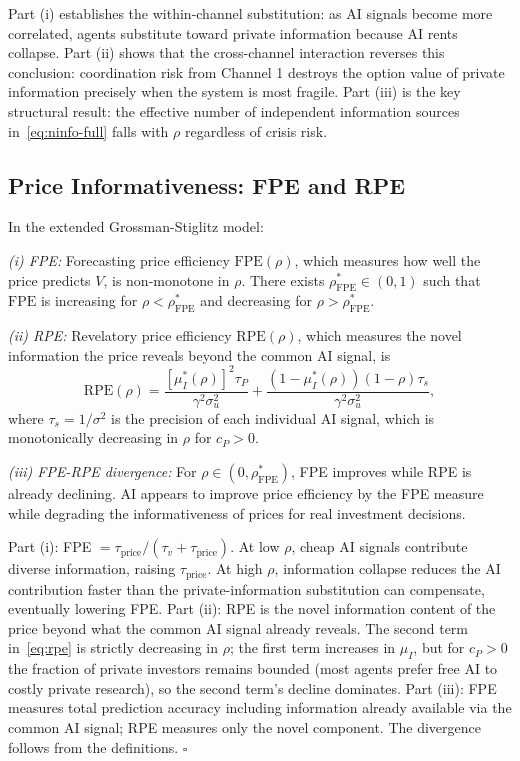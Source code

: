 Part (i) establishes the within-channel substitution: as AI signals become more correlated, agents substitute toward private information because AI rents collapse. Part (ii) shows that the cross-channel interaction reverses this conclusion: coordination risk from Channel 1 destroys the option value of private information precisely when the system is most fragile. Part (iii) is the key structural result: the effective number of independent information sources in~\eqref{eq:ninfo-full} falls with $\rho$ regardless of crisis risk.

\subsection{Price Informativeness: FPE and RPE}

\begin{proposition}\label{prop:rpe}
  In the extended Grossman-Stiglitz model:

  \emph{(i) FPE:} Forecasting price efficiency $\mathrm{FPE}(\rho)$, which measures how well the price predicts $V$, is non-monotone in $\rho$. There exists $\rho_{\text{FPE}}^* \in (0,1)$ such that $\mathrm{FPE}$ is increasing for $\rho < \rho_{\text{FPE}}^*$ and decreasing for $\rho > \rho_{\text{FPE}}^*$.

  \emph{(ii) RPE:} Revelatory price efficiency $\mathrm{RPE}(\rho)$, which measures the novel information the price reveals beyond the common AI signal, is
  \begin{equation}\label{eq:rpe}
    \mathrm{RPE}(\rho) = \frac{\left[\mu_I^*(\rho)\right]^2 \tau_P}{\gamma^2 \sigma_u^2} + \frac{(1-\mu_I^*(\rho))(1-\rho)\tau_s}{\gamma^2\sigma_u^2},
  \end{equation}
  where $\tau_s = 1/\sigma^2$ is the precision of each individual AI signal,
  which is monotonically decreasing in $\rho$ for $c_P > 0$.

  \emph{(iii) FPE-RPE divergence:} For $\rho \in (0, \rho_{\text{FPE}}^*)$, FPE improves while RPE is already declining. AI appears to improve price efficiency by the FPE measure while degrading the informativeness of prices for real investment decisions.

   Part (i): FPE $= \tau_{\text{price}}/(\tau_v + \tau_{\text{price}})$. At low $\rho$, cheap AI signals contribute diverse information, raising $\tau_{\text{price}}$. At high $\rho$, information collapse reduces the AI contribution faster than the private-information substitution can compensate, eventually lowering FPE. Part (ii): RPE is the novel information content of the price beyond what the common AI signal already reveals. The second term in~\eqref{eq:rpe} is strictly decreasing in $\rho$; the first term increases in $\mu_I$, but for $c_P > 0$ the fraction of private investors remains bounded (most agents prefer free AI to costly private research), so the second term's decline dominates. Part (iii): FPE measures total prediction accuracy including information already available via the common AI signal; RPE measures only the novel component. The divergence follows from the definitions. $\square$
\end{proposition}

